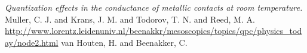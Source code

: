 %


\begin{thebibliography}{99}
\vspace*{0.2mm}
\emph{Quantization effects in the conductance of metallic contacts at room temperature.} Muller, C. J. and Krans, J. M. and Todorov, T. N. and Reed, M. A.
\vspace*{0.2mm}
\url{http://www.lorentz.leidenuniv.nl/beenakkr/mesoscopics/topics/qpc/physics_today/node2.html} van Houten, H. and  Beenakker, C.
\vspace*{0.2mm}
\


\end{thebibliography}




% 